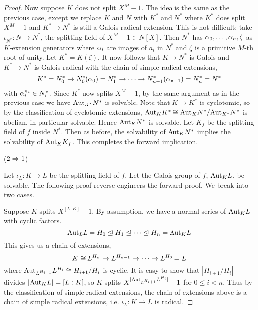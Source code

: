 \documentclass[../book.tex]{subfiles}
\begin{document}
\begin{proof}
    Now suppose $K$ does not split $X^M - 1$. 
    The idea is the same as the previous case, 
    except we replace $K$ and $N$ with $K^*$ and $N^*$
    where $K^*$ does split $X^M - 1$ and 
    $K^* \to N^*$ is still a Galois radical extension.
    This is not difficult: 
    take $\iota_{N^*} : N \to N^*$, the splitting field of $X^M - 1 \in N[X]$.
    Then $N^*$ has $\alpha_0,\dots,\alpha_n,\zeta$ as $K$-extension generators
    where $\alpha_i$ are images of $a_i$ in $N^*$ and 
    $\zeta$ is a primitive $M$-th root of unity.
    Let $K^* = K(\zeta)$.
    It now follows that $K \to N^*$ is Galois and
    $K^* \to N^*$ is Galois radical with the chain of simple radical extensions, \[
        K^* = N^*_0 \to N^*_0(\alpha_0) = N^*_1 \to \cdots 
        \to N^*_{n-1}(\alpha_{n-1}) = N^*_n = N^*
    \]
    with $\alpha_i^{n_i} \in N^*_i$. 
    Since $K^*$ now splits $X^M - 1$, 
    by the same argument as in the previous case
    we have $\mathrm{Aut}_{K^*}N^*$ is solvable.
    Note that $K \to K^*$ is cyclotomic, 
    so by the classification of cyclotomic extensions,
    $\mathrm{Aut}_{K}K^* \cong \mathrm{Aut}_{K}N^* / \mathrm{Aut}_{K^*}N^*$ is abelian,
    in particular solvable.
    Hence $\mathrm{Aut}_{K}N^*$ is solvable.
    Let $K_f$ be the splitting field of $f$ inside $N^*$.
    Then as before, the solvability of $\mathrm{Aut}_{K}N^*$ implies
    the solvability of $\mathrm{Aut}_{K}K_f$. 
    This completes the forward implication. 
    
    ($2 \Rightarrow 1$)
    
    Let $\iota_L : K \to L$ be the splitting field of $f$.
    Let the Galois group of $f$, $\mathrm{Aut}_{K}L$, be solvable.
    The following proof reverse engineers the forward proof.
    We break into two cases.
    
    Suppose $K$ splits $X^{[L : K]} - 1$. 
    By assumption, we have a normal series of $\mathrm{Aut}_{K}L$ with cyclic factors.\[
        \mathrm{Aut}_{L}L = H_0 \trianglelefteq H_1 \trianglelefteq \cdots \trianglelefteq H_n = \mathrm{Aut}_{K}L
    \]
    This gives us a chain of extensions, \[
        K \cong L^{H_n} \to L^{H_{n-1}} \to \cdots \to L^{H_0} = L
    \]
    where $\mathrm{Aut}_{L^{H_{i+1}}}L^{H_i} \cong H_{i+1} / H_i$ is cyclic.
    It is easy to show that $|H_{i+1} / H_i|$ divides $|\mathrm{Aut}_{K}L| = [L : K]$,
    so $K$ splits $X^{|\mathrm{Aut}_{L^{H_{i+1}}}L^{H_i}|} - 1$ for $0 \leq i < n$. 
    Thus by the classification of simple radical extensions,
    the chain of extensions above is a chain of simple radical extensions,
    i.e. $\iota_L : K \to L$ is radical. 
    

\end{proof}
\end{document}
